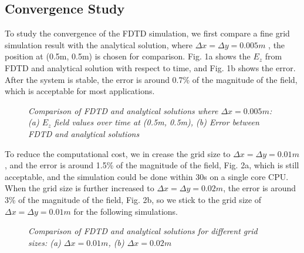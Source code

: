 \documentclass[journal]{IEEEtran}
\begin{document}
\subsection{Convergence Study}
To study the convergence of the FDTD simulation, we first compare a fine grid simulation result with the analytical solution, where $\Delta x = \Delta y = 0.005m$
, the position at (0.5m, 0.5m) is chosen for comparison. Fig. 1a shows the $E_z$ from FDTD and analytical solution with respect to time, and Fig. 1b shows 
the error. After the system is stable, the error is around 0.7\% of the magnitude of the field, which is acceptable for most applications.
\begin{figure}[htbp]
    \centering
    \hfill
    \caption{\small\textit{Comparison of FDTD and analytical solutions where $\Delta x = 0.005m$: (a) $E_z$ field values over time at (0.5m, 0.5m), (b) Error between FDTD and analytical solutions}}
    \label{fig:comparison}
\end{figure}

To reduce the computational cost, we in crease the grid size to $\Delta x = \Delta y = 0.01m$, and the error is around 1.5\% of the magnitude of the field, Fig. 2a,
which is still acceptable, and the simulation could be done within 30s on a single core CPU. When the grid size is further increased to 
$\Delta x = \Delta y = 0.02m$, the error is around 3\% of the magnitude of the field, Fig. 2b, so we stick to the grid size of $\Delta x = \Delta y = 0.01m$ for 
the following simulations.
\begin{figure}[htbp]
    \centering
    \hfill
    \caption{\small\textit{Comparison of FDTD and analytical solutions for different grid sizes: (a) $\Delta x = 0.01m$, (b) $\Delta x = 0.02m$}}
    \label{fig:grid_comparison}
\end{figure}
\end{document}
